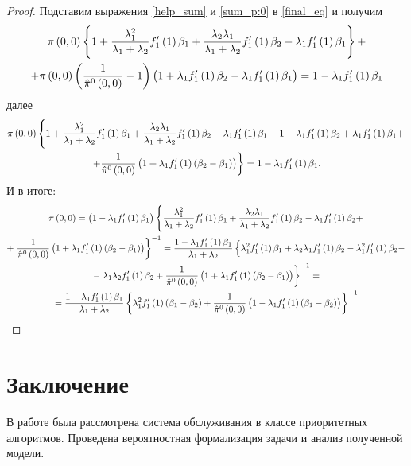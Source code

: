 \documentclass[a4paper,14pt,russian]{article}
\begin{document}
\begin{proof}
Подставим выражения \eqref{help_sum} и \eqref{sum_p:0} в \eqref{final_eq} и получим
\begin{multline*}
  \pi\left(0,0\right)\left\{1 + \frac{\lambda_1^2}{\lambda_1+\lambda_2} f_1'\left(1\right) \beta_1 + \frac{\lambda_2 \lambda_1}{\lambda_1+ \lambda_2}
 f_1'\left(1\right) \beta_2  - \lambda_1 f_1'\left(1\right) \beta_1\right\} +\\+
\pi\left(0,0\right) \left(\frac{1}{\hat{\pi}^0\left(0,0\right)} - 1\right)\left(1 + \lambda_1 f_1'\left(1\right) \beta_2  - \lambda_1 f_1'\left(1\right) \beta_1\right)
=  1 -\lambda_1 f_1'\left(1\right) \beta_1
\end{multline*}
далее
\begin{multline*}
  \pi\left(0,0\right)\left\{1 + \frac{\lambda_1^2}{\lambda_1+\lambda_2} f_1'\left(1\right) \beta_1 + \frac{\lambda_2 \lambda_1}{\lambda_1+ \lambda_2}
 f_1'\left(1\right) \beta_2 - \lambda_1 f_1'\left(1\right) \beta_1   -
  1 - \lambda_1 f_1'\left(1\right) \beta_2  + \lambda_1 f_1'\left(1\right) \beta_1  + \right. \\ \left. + \frac{1}{\hat{\pi}^0\left(0,0\right)}
 \left(1 + \lambda_1 f_1'\left(1\right) \left(\beta_2 - \beta_1\right) \right)\right\} =  1 -\lambda_1 f_1'\left(1\right) \beta_1.
\end{multline*}
И в итоге:
\begin{multline}
  \pi\left(0,0\right) = \left(  1 -\lambda_1 f_1'\left(1\right) \beta_1\right) \left\{\frac{\lambda_1^2}{\lambda_1+\lambda_2} 
  f_1'\left(1\right) \beta_1 + \frac{\lambda_2 \lambda_1}{\lambda_1+ \lambda_2}
 f_1'\left(1\right) \beta_2  - \lambda_1 f_1'\left(1\right) \beta_2  + \right. \\ +\left.   \frac{1}{\hat{\pi}^0\left(0,0\right)}
 \left(1 + \lambda_1 f_1'\left(1\right) \left(\beta_2 - \beta_1\right) \right)\right\}^{-1} =
\frac{  1 -\lambda_1 f_1'\left(1\right) \beta_1}{\lambda_1 + \lambda_2} \left\{\lambda_1^2 f_1'\left(1\right) \beta_1 + \lambda_2 \lambda_1 f_1'\left(1\right) \beta_2 
 - \lambda_1^2 f_1'\left(1\right) \beta_2 -\right.\\ -\left.  \lambda_1 \lambda_2 f_1'\left(1\right) \beta_2 +\frac{1}{\hat{\pi}^0\left(0,0\right)}
 \left(1 + \lambda_1 f_1'\left(1\right) \left(\beta_2 - \beta_1\right) \right)\right\}^{-1} = \\=
\frac{  1 -\lambda_1 f_1'\left(1\right) \beta_1}{\lambda_1 + \lambda_2} \left\{\lambda_1^2 f_1'\left(1\right)\left( \beta_1 - \beta_2\right) + \frac{1}{\hat{\pi}^0\left(0,0\right)}
 \left(1 - \lambda_1 f_1'\left(1\right) \left(\beta_1 - \beta_2\right) \right)\right\}^{-1}
\end{multline}

\end{proof}
\newpage

\section*{Заключение}
%
В работе была рассмотрена система обслуживания в классе приоритетных алгоритмов. Проведена вероятностная формализация задачи и анализ полученной модели.
\end{document}
